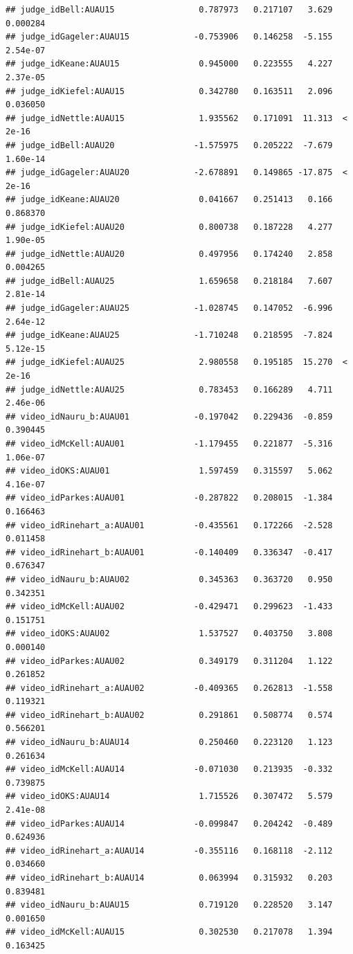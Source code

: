 \documentclass{monashthesis}
\begin{document}
\begin{verbatim}
## judge_idBell:AUAU15                 0.787973   0.217107   3.629 0.000284
## judge_idGageler:AUAU15             -0.753906   0.146258  -5.155 2.54e-07
## judge_idKeane:AUAU15                0.945000   0.223555   4.227 2.37e-05
## judge_idKiefel:AUAU15               0.342780   0.163511   2.096 0.036050
## judge_idNettle:AUAU15               1.935562   0.171091  11.313  < 2e-16
## judge_idBell:AUAU20                -1.575975   0.205222  -7.679 1.60e-14
## judge_idGageler:AUAU20             -2.678891   0.149865 -17.875  < 2e-16
## judge_idKeane:AUAU20                0.041667   0.251413   0.166 0.868370
## judge_idKiefel:AUAU20               0.800738   0.187228   4.277 1.90e-05
## judge_idNettle:AUAU20               0.497956   0.174240   2.858 0.004265
## judge_idBell:AUAU25                 1.659658   0.218184   7.607 2.81e-14
## judge_idGageler:AUAU25             -1.028745   0.147052  -6.996 2.64e-12
## judge_idKeane:AUAU25               -1.710248   0.218595  -7.824 5.12e-15
## judge_idKiefel:AUAU25               2.980558   0.195185  15.270  < 2e-16
## judge_idNettle:AUAU25               0.783453   0.166289   4.711 2.46e-06
## video_idNauru_b:AUAU01             -0.197042   0.229436  -0.859 0.390445
## video_idMcKell:AUAU01              -1.179455   0.221877  -5.316 1.06e-07
## video_idOKS:AUAU01                  1.597459   0.315597   5.062 4.16e-07
## video_idParkes:AUAU01              -0.287822   0.208015  -1.384 0.166463
## video_idRinehart_a:AUAU01          -0.435561   0.172266  -2.528 0.011458
## video_idRinehart_b:AUAU01          -0.140409   0.336347  -0.417 0.676347
## video_idNauru_b:AUAU02              0.345363   0.363720   0.950 0.342351
## video_idMcKell:AUAU02              -0.429471   0.299623  -1.433 0.151751
## video_idOKS:AUAU02                  1.537527   0.403750   3.808 0.000140
## video_idParkes:AUAU02               0.349179   0.311204   1.122 0.261852
## video_idRinehart_a:AUAU02          -0.409365   0.262813  -1.558 0.119321
## video_idRinehart_b:AUAU02           0.291861   0.508774   0.574 0.566201
## video_idNauru_b:AUAU14              0.250460   0.223120   1.123 0.261634
## video_idMcKell:AUAU14              -0.071030   0.213935  -0.332 0.739875
## video_idOKS:AUAU14                  1.715526   0.307472   5.579 2.41e-08
## video_idParkes:AUAU14              -0.099847   0.204242  -0.489 0.624936
## video_idRinehart_a:AUAU14          -0.355116   0.168118  -2.112 0.034660
## video_idRinehart_b:AUAU14           0.063994   0.315932   0.203 0.839481
## video_idNauru_b:AUAU15              0.719120   0.228520   3.147 0.001650
## video_idMcKell:AUAU15               0.302530   0.217078   1.394 0.163425

\end{verbatim}
\end{document}
